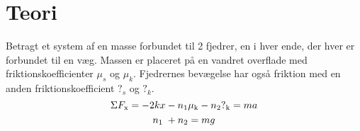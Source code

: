 \chapter{Teori}
Betragt et system af en masse forbundet til 2 fjedrer, en i hver ende, der hver er forbundet til en væg. 
Massen er placeret på en vandret overflade med friktionskoefficienter $\mu_s$ og $\mu_k$. 
Fjedrernes bevægelse har også friktion med en anden friktionskoefficient $?_s$ og $?_k$.
\[
\Sigma F_{\textup{x}} = -2kx - n_{\textup{1}}\mu_{\textup{k}} - n_{\textup{2}} ?_{\textup{k}}= ma
\]
\[
n_{\textup{1 }} + n_{\textup{2}} = mg
\]
